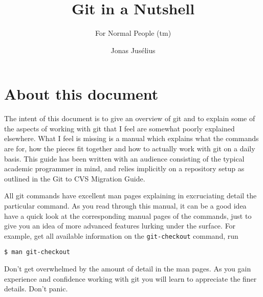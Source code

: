 \documentclass[a4paper,10pt]{article}
\begin{document}
\pagestyle{fancy}
\fancyfoot{}
\fancyhead{}
\renewcommand{\sectionmark}[1]{\markboth{\sf\thesection.\ #1}{}}
\renewcommand{\subsectionmark}[1]{}
\fancyhead[R]{{\rmfamily\thepage}}

\title{Git in a Nutshell}

\subtitle{For Normal People (tm)}
\author{{\sf Jonas Jus\'elius}}
\address{
{\tt <jonas.juselius@chem.uit.no>}\\
{\sf Centre for Theoretical and Computational Chemistry}\\
{\sf University of Tromsø}\\
{\sf N-9037 University of Tromsø, Norway}
}


\maketitle
\tableofcontents
\newpage

\section*{About this document}
The intent of this document is to give an overview of git and to explain some of
the aspects of working with git that I feel are somewhat poorly explained
elsewhere. 
What I feel is missing is a manual which explains what the commands are for,
how the pieces fit together and how to actually work with git on a daily
basis. This guide has been written with an audience consisting of the typical
academic programmer in mind, and relies implicitly on a repository setup as
outlined in the Git to CVS Migration Guide.

All git commands have excellent man pages explaining in
excruciating detail the particular command. As you read through this manual,
it can be a good idea have a quick look at the corresponding manual pages of
the commands, just to give you an idea of more advanced features lurking under
the surface. For example, get all available information on the
\texttt{git-checkout} command, run
\begin{verbatim}
$ man git-checkout
\end{verbatim}
Don't get overwhelmed by the amount of detail in the man pages. As
you gain experience and confidence working with git you will learn to
appreciate the finer details. Don't panic.
\end{document}
